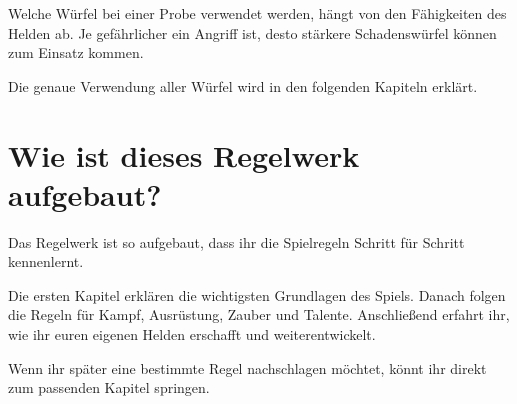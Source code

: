 Welche Würfel bei einer Probe verwendet werden, hängt von den Fähigkeiten des Helden ab. Je gefährlicher ein Angriff ist, desto stärkere Schadenswürfel können zum Einsatz kommen.

Die genaue Verwendung aller Würfel wird in den folgenden Kapiteln erklärt.

\section{Wie ist dieses Regelwerk aufgebaut?}

Das Regelwerk ist so aufgebaut, dass ihr die Spielregeln Schritt für Schritt kennenlernt.

Die ersten Kapitel erklären die wichtigsten Grundlagen des Spiels. Danach folgen die Regeln für Kampf, Ausrüstung, Zauber und Talente. Anschließend erfahrt ihr, wie ihr euren eigenen Helden erschafft und weiterentwickelt.

Wenn ihr später eine bestimmte Regel nachschlagen möchtet, könnt ihr direkt zum passenden Kapitel springen.
